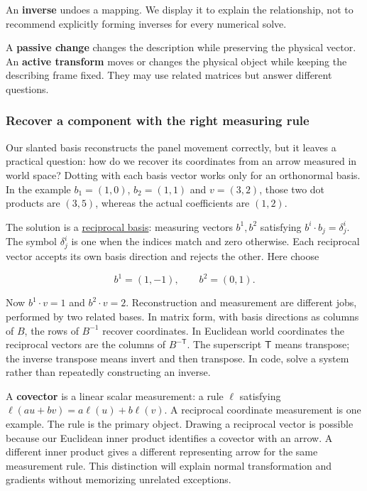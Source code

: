 An \textbf{inverse} undoes a mapping. We display it to explain the relationship, not to recommend explicitly forming inverses for every numerical solve.

A \textbf{passive change} changes the description while preserving the physical vector. An \textbf{active transform} moves or changes the physical object while keeping the describing frame fixed. They may use related matrices but answer different questions.

\subsubsection{Recover a component with the right measuring rule}\label{01-foundations-i-ch017-recover-a-component-with-the-right-measuring-rule}

Our slanted basis reconstructs the panel movement correctly, but it leaves a practical question: how do we recover its coordinates from an arrow measured in world space? Dotting with each basis vector works only for an orthonormal basis. In the example \(b_1=(1,0)\), \(b_2=(1,1)\) and \(v=(3,2)\), those two dot products are \((3,5)\), whereas the actual coefficients are \((1,2)\).

The solution is a \hyperref[appendix-6b3d696dd902]{reciprocal basis}: measuring vectors \(b^1,b^2\) satisfying \(b^i\cdot b_j=\delta^i_j\). The symbol \(\delta^i_j\) is one when the indices match and zero otherwise. Each reciprocal vector accepts its own basis direction and rejects the other. Here choose

\[
b^1=(1,-1),\qquad b^2=(0,1).
\]

Now \(b^1\cdot v=1\) and \(b^2\cdot v=2\). Reconstruction and measurement are different jobs, performed by two related bases. In matrix form, with basis directions as columns of \(B\), the rows of \(B^{-1}\) recover coordinates. In Euclidean world coordinates the reciprocal vectors are the columns of \(B^{-\mathsf T}\). The superscript \(\mathsf T\) means transpose; the inverse transpose means invert and then transpose. In code, solve a system rather than repeatedly constructing an inverse.

A \textbf{covector} is a linear scalar measurement: a rule \(\ell\) satisfying \(\ell(au+bv)=a\ell(u)+b\ell(v)\). A reciprocal coordinate measurement is one example. The rule is the primary object. Drawing a reciprocal vector is possible because our Euclidean inner product identifies a covector with an arrow. A different inner product gives a different representing arrow for the same measurement rule. This distinction will explain normal transformation and gradients without memorizing unrelated exceptions.

